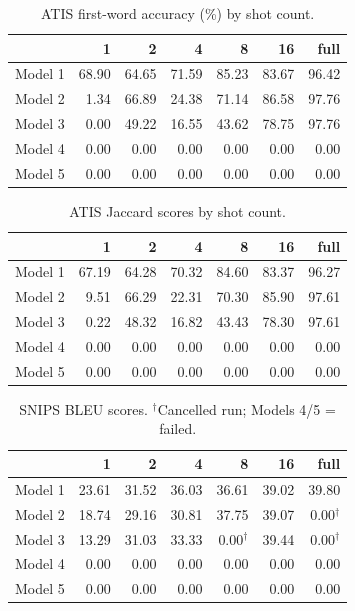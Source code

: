 \documentclass[11pt]{article}
\begin{document}
\begin{table}[t]
\centering
\small
\setlength{\tabcolsep}{4pt}
\begin{tabular}{lrrrrrr}
\toprule
 & 1 & 2 & 4 & 8 & 16 & full \\
\midrule
Model 1 & 68.90 & 64.65 & 71.59 & 85.23 & 83.67 & 96.42 \\
Model 2 & 1.34 & 66.89 & 24.38 & 71.14 & 86.58 & 97.76 \\
Model 3 & 0.00 & 49.22 & 16.55 & 43.62 & 78.75 & 97.76 \\
Model 4 & 0.00 & 0.00 & 0.00 & 0.00 & 0.00 & 0.00 \\
Model 5 & 0.00 & 0.00 & 0.00 & 0.00 & 0.00 & 0.00 \\
\bottomrule
\end{tabular}
\caption{ATIS first-word accuracy (\%) by shot count.}
\label{tab:atis-fw}
\end{table}

\begin{table}[t]
\centering
\small
\setlength{\tabcolsep}{4pt}
\begin{tabular}{lrrrrrr}
\toprule
 & 1 & 2 & 4 & 8 & 16 & full \\
\midrule
Model 1 & 67.19 & 64.28 & 70.32 & 84.60 & 83.37 & 96.27 \\
Model 2 & 9.51 & 66.29 & 22.31 & 70.30 & 85.90 & 97.61 \\
Model 3 & 0.22 & 48.32 & 16.82 & 43.43 & 78.30 & 97.61 \\
Model 4 & 0.00 & 0.00 & 0.00 & 0.00 & 0.00 & 0.00 \\
Model 5 & 0.00 & 0.00 & 0.00 & 0.00 & 0.00 & 0.00 \\
\bottomrule
\end{tabular}
\caption{ATIS Jaccard scores by shot count.}
\label{tab:atis-jaccard}
\end{table}

\begin{table}[t]
\centering
\small
\setlength{\tabcolsep}{4pt}
\begin{tabular}{lrrrrrr}
\toprule
 & 1 & 2 & 4 & 8 & 16 & full \\
\midrule
Model 1 & 23.61 & 31.52 & 36.03 & 36.61 & 39.02 & 39.80 \\
Model 2 & 18.74 & 29.16 & 30.81 & 37.75 & 39.07 & 0.00$^{\dagger}$ \\
Model 3 & 13.29 & 31.03 & 33.33 & 0.00$^{\dagger}$ & 39.44 & 0.00$^{\dagger}$ \\
Model 4 & 0.00 & 0.00 & 0.00 & 0.00 & 0.00 & 0.00 \\
Model 5 & 0.00 & 0.00 & 0.00 & 0.00 & 0.00 & 0.00 \\
\bottomrule
\end{tabular}
\caption{SNIPS BLEU scores. $^{\dagger}$Cancelled run; Models 4/5 = failed.}
\label{tab:snips-bleu}
\end{table}
\end{document}
